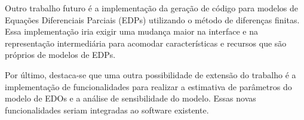 \documentclass[
	12pt,				%
	openright,			%
	oneside,			%
	a4paper,			%
	main=brazil,
	english,			%
	]{ufsj-abntex2}
\begin{document}
Outro trabalho futuro é a implementação da geração de código para modelos de Equações Diferenciais Parciais (EDPs) utilizando o método de diferenças finitas. Essa implementação iria exigir uma mudança maior na interface e na representação intermediária para acomodar características e recursos que são próprios de modelos de EDPs. 

Por último, destaca-se que uma outra possibilidade de extensão do trabalho é a implementação de funcionalidades para realizar a estimativa de parâmetros do modelo de EDOs e a análise de sensibilidade do modelo. Essas novas funcionalidades seriam integradas ao software existente.  




\postextual




%

\end{document}
